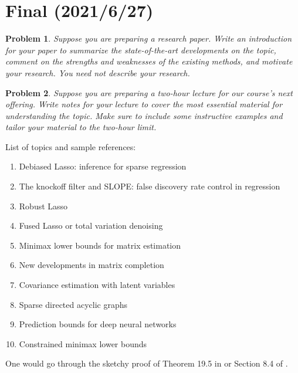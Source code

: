 \documentclass[11pt, a3paper, openany]{article}
\theoremstyle{remark}
\theoremstyle{remark}
\theoremstyle{remark}
\newenvironment{Proof of claim}
  {\begin{proof}[\normalfont \textbf{Proof of claim}]}
  {\end{proof}}
\theoremstyle{definition}
\theoremstyle{remark}
\theoremstyle{plain}
\newtheorem{Prob}{Problem}
\begin{document}
\clearpage

\section*{\bf Final \sf\scriptsize (2021/6/27)}
\setcounter{Prob}{0}
\begin{Prob}
Suppose you are preparing a research paper. Write an introduction for your paper to summarize the state-of-the-art developments on the topic, comment on the strengths and weaknesses of the existing methods, and motivate your research. You need not describe your research.
\end{Prob}
\begin{Prob}
Suppose you are preparing a two-hour lecture for our course's next offering. Write notes for your lecture to cover the most essential material for understanding the topic. Make sure to include some instructive examples and tailor your material to the two-hour limit.
\end{Prob}

{\large List of topics and sample references:}
\begin{enumerate}
\item Debiased Lasso: inference for sparse regression
\item The knockoff filter and SLOPE: false discovery rate control in regression 
\item Robust Lasso
\item Fused Lasso or total variation denoising
\item Minimax lower bounds for matrix estimation
\item New developments in matrix completion
\item Covariance estimation with latent variables
\item Sparse directed acyclic graphs
\item Prediction bounds for deep neural networks
\item Constrained minimax lower bounds
\end{enumerate}
One would go through the sketchy proof of Theorem 19.5 in \cite{vdVaart1998asymptotic} or Section 8.4 of \cite{Kosorok2008Introduction}.
\end{document}
